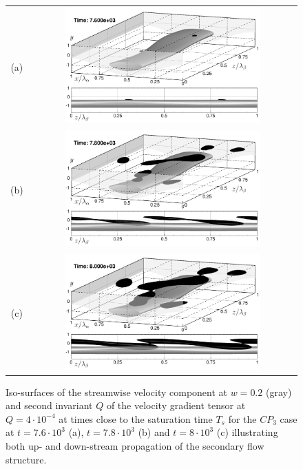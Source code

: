 \documentclass[lineno]{jfm}
\begin{document}
\begin{figure}
\centering
\begin{tabular}{cc}
    (a) & \includegraphics[width=0.75\textwidth]{f092_7600.png} \\
    (b) & \includegraphics[width=0.75\textwidth]{f092_7800.png} \\
    (c) & \includegraphics[width=0.75\textwidth]{f092_8000.png} \\
\end{tabular}
\caption{Iso-surfaces of the streamwise velocity component at $w=0.2$ (gray) and second invariant $Q$ of the velocity gradient tensor at $Q=4\cdot10^{-4}$ at times close to the saturation time $T_s$
for the $CP_3$ case at $t=7.6\cdot10^3$ (a), $t=7.8\cdot10^3$ (b) and $t=8\cdot10^3$ (c) illustrating both up- and down-stream propagation of the secondary flow structure.} 
\label{fig:topo_092_time}
\end{figure}
\end{document}
